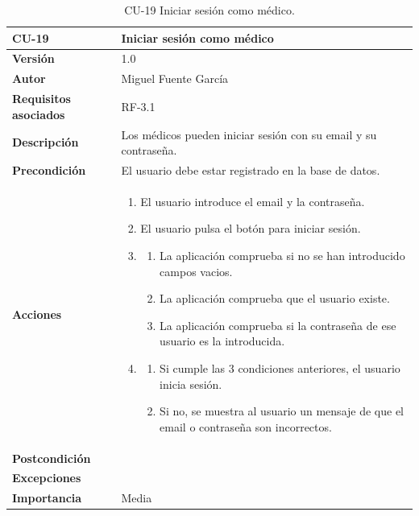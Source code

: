 \begin{table}[p]
	\centering
	\begin{tabularx}{\linewidth}{ p{} p{} }
		\toprule
		\textbf{CU-19}    & \textbf{Iniciar sesión como médico}\\
		\toprule
		\textbf{Versión}              & 1.0    \\
		\textbf{Autor}                & Miguel Fuente García \\
		\textbf{Requisitos asociados} & RF-3.1 \\
		\textbf{Descripción}          & Los médicos pueden iniciar sesión con su email y su contraseña. \\
		\textbf{Precondición}         & El usuario debe estar registrado en la base de datos. \\
		\textbf{Acciones}             &
		\begin{enumerate}
			\def\labelenumi{\arabic{enumi}.}
			\tightlist
			\item El usuario introduce el email y la contraseña.
            \item El usuario pulsa el botón para iniciar sesión.
            \item \begin{enumerate}
                \item La aplicación comprueba si no se han introducido campos vacios.
                \item La aplicación comprueba que el usuario existe.
                \item La aplicación comprueba si la contraseña de ese usuario es la introducida.
            \end{enumerate}
            \item \begin{enumerate}
                \item Si cumple las 3 condiciones anteriores, el usuario inicia sesión.
                \item Si no, se muestra al usuario un mensaje de que el email o contraseña son incorrectos.
            \end{enumerate}
		\end{enumerate}\\
		\textbf{Postcondición}        &  \\
		\textbf{Excepciones}          &  \\
		\textbf{Importancia}          & Media  \\
		\bottomrule
	\end{tabularx}
	\caption{CU-19 Iniciar sesión como médico.}
\end{table}

